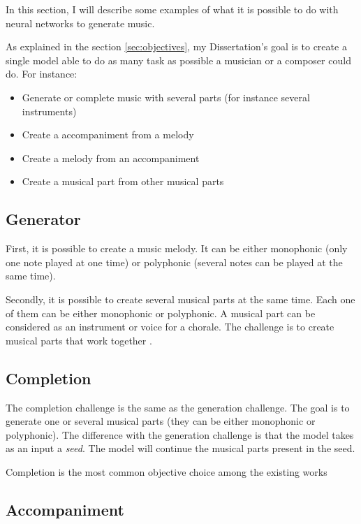 \documentclass[12pt]{report}
\begin{document}
In this section, I will describe some examples of what it is possible to do with neural networks to generate music.

As explained in the section \ref{sec:objectives}, my Dissertation's goal is to create a single model able to do as many task as possible a musician or a composer could do.
For instance:
\begin{itemize}
    \item Generate or complete music with several parts (for instance several instruments)
    \item Create a accompaniment from a melody
    \item Create a melody from an accompaniment
    \item Create a musical part from other musical parts
\end{itemize}

\subsection{Generator}

First, it is possible to create a music melody. It can be either monophonic (only one note played at one time) or polyphonic (several notes can be played at the same time).

Secondly, it is possible to create several musical parts at the same time. Each one of them can be either monophonic or polyphonic.
A musical part can be considered as an instrument or voice for a chorale.
The challenge is to create musical parts that work together \cite{donahue_adversarial_2019}.

\subsection{Completion}

The completion challenge is the same as the generation challenge.
The goal is to generate one or several musical parts (they can be either monophonic or polyphonic).
The difference with the generation challenge is that the model takes as an input a \textit{seed}.
The model will continue the musical parts present in the seed.

Completion is the most common objective choice among the existing works \cite{liang_automatic_2017, chuan_modeling_nodate, huang_counterpoint_2017, boulanger-lewandowski_modeling_2012, lattner_imposing_2018}

\subsection{Accompaniment}
\end{document}
